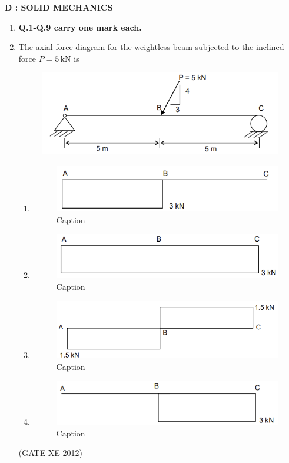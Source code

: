 \documentclass[12pt]{article}
\begin{document}
\newpage

\begin{center}
{\Large\textbf{D : SOLID MECHANICS}}
\end{center}

\begin{enumerate}

\item[] \textbf{Q.1-Q.9 carry one mark each.}

\item The axial force diagram for the weightless beam subjected to the inclined force $P = 5 \, \text{kN}$ is

\begin{figure}[H]
    \centering
    \includegraphics[width=0.5\columnwidth]{figs/ass2_d_q1_q.png}
    \caption{}
    \label{fig:placeholder}
\end{figure}
\begin{enumerate}
\item \begin{figure}[H]
    \centering
    \includegraphics[width=0.5\columnwidth]{figs/ass2_d_q1_a.png}
    \caption{Caption}
    \label{fig:placeholder}
\end{figure}
\item \begin{figure}[H]
    \centering
    \includegraphics[width=0.5\columnwidth]{figs/ass2_d_q1_b.png}
    \caption{Caption}
    \label{fig:placeholder}
\end{figure}
\item \begin{figure}[H]
    \centering
    \includegraphics[width=0.5\columnwidth]{figs/ass2_d_q1_c.png}
    \caption{Caption}
    \label{fig:placeholder}
\end{figure}
\item \begin{figure}[H]
    \centering
    \includegraphics[width=0.5\columnwidth]{figs/ass2_d_q1_d.png}
    \caption{Caption}
    \label{fig:placeholder}
\end{figure}
\end{enumerate}
(GATE XE 2012)


\end{enumerate}
\end{document}
